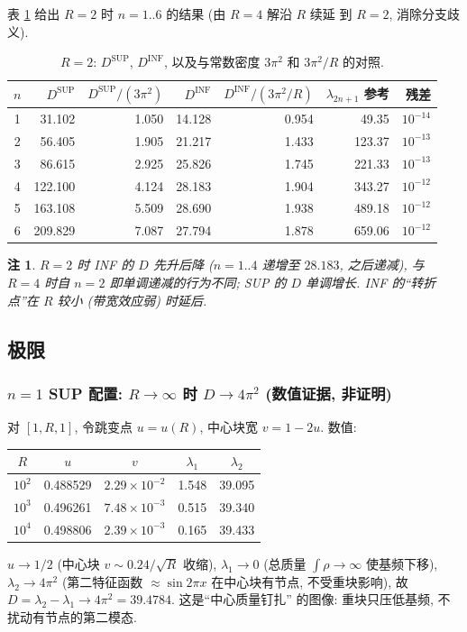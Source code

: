 \documentclass[UTF8]{ctexart}
\newtheorem{remark}[theorem]{注}
\begin{document}
表 \ref{tab:r2} 给出 $R=2$ 时 $n=1..6$ 的结果 (由 $R=4$ 解沿 $R$ 续延
到 $R=2$, 消除分支歧义).

\begin{table}[ht]
\centering
\caption{$R=2$: $D^{\mathrm{SUP}}$, $D^{\mathrm{INF}}$, 以及与常数密度
$3\pi^2$ 和 $3\pi^2/R$ 的对照.}
\label{tab:r2}
\begin{tabular}{c|rrr|rrr}
	$n$ & $D^{\mathrm{SUP}}$ & $D^{\mathrm{SUP}}/(3\pi^2)$ &
	$D^{\mathrm{INF}}$ & $D^{\mathrm{INF}}/(3\pi^2/R)$ &
	$\lambda_{2n+1}$ 参考 & 残差 \\\hline
	1 & 31.102 & 1.050 & 14.128 & 0.954 & 49.35 & $10^{-14}$\\
	2 & 56.405 & 1.905 & 21.217 & 1.433 & 123.37 & $10^{-13}$\\
	3 & 86.615 & 2.925 & 25.826 & 1.745 & 221.33 & $10^{-13}$\\
	4 & 122.100 & 4.124 & 28.183 & 1.904 & 343.27 & $10^{-12}$\\
	5 & 163.108 & 5.509 & 28.690 & 1.938 & 489.18 & $10^{-12}$\\
	6 & 209.829 & 7.087 & 27.794 & 1.878 & 659.06 & $10^{-12}$\\
\end{tabular}
\end{table}

\begin{remark}
	$R=2$ 时 INF 的 $D$ 先升后降 ($n=1..4$ 递增至 $28.183$, 之后递减),
	与 $R=4$ 时自 $n=2$ 即单调递减的行为不同; SUP 的 $D$ 单调增长.
	INF 的``转折点''在 $R$ 较小 (带宽效应弱) 时延后.
\end{remark}

\subsection{极限}\label{sec:limit}

\subsubsection{$n=1$ SUP 配置: \texorpdfstring{$R \to \infty$}{R-inf} 时 \texorpdfstring{$D \to 4\pi^2$}{D-4pi2} (数值证据, 非证明)}

对 $[1, R, 1]$, 令跳变点 $u = u(R)$, 中心块宽 $v = 1 - 2u$. 数值:
\begin{center}
\begin{tabular}{c|cccc}
	$R$ & $u$ & $v$ & $\lambda_1$ & $\lambda_2$ \\\hline
	$10^2$ & 0.488529 & $2.29\times10^{-2}$ & 1.548 & 39.095\\
	$10^3$ & 0.496261 & $7.48\times10^{-3}$ & 0.515 & 39.340\\
	$10^4$ & 0.498806 & $2.39\times10^{-3}$ & 0.165 & 39.433\\
\end{tabular}
\end{center}
$u \to 1/2$ (中心块 $v \sim 0.24/\sqrt{R}$ 收缩), $\lambda_1 \to 0$
(总质量 $\int\rho \to \infty$ 使基频下移), $\lambda_2 \to 4\pi^2$
(第二特征函数 $\approx \sin 2\pi x$ 在中心块有节点, 不受重块影响),
故 $D = \lambda_2 - \lambda_1 \to 4\pi^2 = 39.4784$. 这是``中心质量钉扎''
的图像: 重块只压低基频, 不扰动有节点的第二模态.
\end{document}
